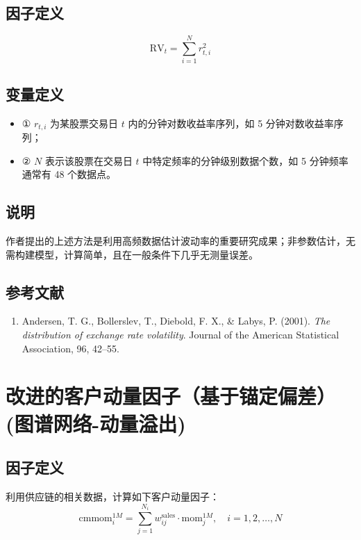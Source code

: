 \documentclass{article}
\begin{document}
\subsection{因子定义}
\begin{equation}
    \mathrm{RV}_t = \sum_{i=1}^N r_{t,i}^2
\end{equation}

\subsection{变量定义}
\begin{itemize}
    \item ① \( r_{t,i} \) 为某股票交易日 \( t \) 内的分钟对数收益率序列，如 5 分钟对数收益率序列；
    \item ② \( N \) 表示该股票在交易日 \( t \) 中特定频率的分钟级别数据个数，如 5 分钟频率通常有 48 个数据点。
\end{itemize}

\subsection{说明}
作者提出的上述方法是利用高频数据估计波动率的重要研究成果；非参数估计，无需构建模型，计算简单，且在一般条件下几乎无测量误差。

\subsection{参考文献}
\begin{enumerate}
    \item Andersen, T. G., Bollerslev, T., Diebold, F. X., \& Labys, P. (2001). \textit{The distribution of exchange rate volatility}. Journal of the American Statistical Association, 96, 42–55.
\end{enumerate}

\section{改进的客户动量因子（基于锚定偏差）(图谱网络-动量溢出)}

\subsection{因子定义}
利用供应链的相关数据，计算如下客户动量因子：
\begin{equation}
    \mathrm{cmmom}_i^{1M} = \sum_{j=1}^{N_i} w_{ij}^{\mathrm{sales}} \cdot \mathrm{mom}_j^{1M}, \quad i = 1, 2, \ldots, N
\end{equation}
\end{document}

